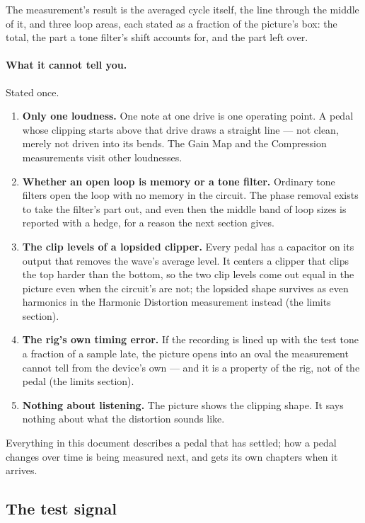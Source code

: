 \documentclass[11pt,a4paper]{article}
\begin{document}
The measurement's result is the averaged cycle itself, the line through
the middle of it, and three loop areas, each stated as a fraction of the
picture's box: the total, the part a tone filter's shift accounts for, and
the part left over.

\paragraph{What it cannot tell you.} Stated once.
\begin{enumerate}
  \item \textbf{Only one loudness.} One note at one drive is one operating
  point. A pedal whose clipping starts above that drive draws a straight
  line --- not clean, merely not driven into its bends. The Gain Map and
  the Compression measurements visit other loudnesses.
  \item \textbf{Whether an open loop is memory or a tone filter.} Ordinary
  tone filters open the loop with no memory in the circuit. The phase
  removal exists to take the filter's part out, and even then the middle
  band of loop sizes is reported with a hedge, for a reason the next
  section gives.
  \item \textbf{The clip levels of a lopsided clipper.} Every pedal has a
  capacitor on its output that removes the wave's average level. It
  centers a clipper that clips the top harder than the bottom, so the two
  clip levels come out equal in the picture even when the circuit's are
  not; the lopsided shape survives as even harmonics in the Harmonic
  Distortion measurement instead (the limits section).
  \item \textbf{The rig's own timing error.} If the recording is lined up
  with the test tone a fraction of a sample late, the picture opens into
  an oval the measurement cannot tell from the device's own --- and it is
  a property of the rig, not of the pedal (the limits section).
  \item \textbf{Nothing about listening.} The picture shows the clipping
  shape. It says nothing about what the distortion sounds like.
\end{enumerate}

Everything in this document describes a pedal that has settled; how a
pedal changes over time is being measured next, and gets its own chapters
when it arrives.

\subsection{The test signal}
\end{document}

